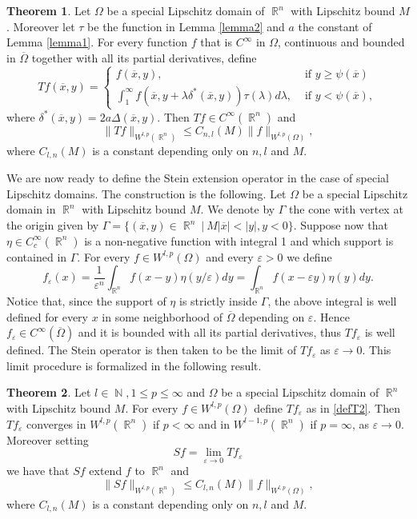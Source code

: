 \documentclass[12pt]{article}
\theoremstyle{definition}
\newtheorem{theorem}{Theorem}
\DeclareMathOperator\rr{\mathbb{R}}
\DeclareMathOperator\nn{\mathbb{N}}
\begin{document}
\begin{theorem}\label{defT}Let $\Omega$ be a special Lipschitz domain of $\rr^n$ with Lipschitz bound $M$. Moreover let $\tau$ be the function in Lemma \ref{lemma2} and $a$ the constant of Lemma \ref{lemma1}. For every function $f$ that is $C^\infty$ in $ \Omega$, continuous and bounded in $\overline \Omega$ together with all its partial derivatives, define
\begin{equation} Tf(\overline x, y)= \begin{cases}
						f(\overline x, y), & \text{ if } y\ge\psi(\overline x) \\
						\int_1^\infty f(\overline x, y+ \lambda \delta^*(\overline x,y))\tau(\lambda)d\lambda, & \text{ if } y<\psi(\overline x),		
\end{cases}
\label{defT2}\end{equation}
where $\delta^*(\overline x,y)=2a\Delta(\overline x, y).$ Then $Tf \in C^\infty(\rr^n)$ and 
\[\| Tf\|_{W^{l,p}(\rr^n)}\le C_{n,l}(M) \| f\|_{W^{l,p}(\Omega)} ,\]
where $C_{l,n}(M)$ is a constant depending only on $n,l$ and $M.$
\end{theorem}

We are now ready to define the Stein extension operator in the case of special Lipschitz domains. The construction is the following. Let $\Omega$ be a special Lipschitz domain in $\rr^n$ with Lipschitz bound $M$. We denote by $\Gamma$ the cone with vertex at the origin given by $\Gamma=\{(\overline x, y) \in \rr^n \ | \ M |\overline x|<|y|, y<0 \}$. Suppose now that $\eta \in C^\infty_c(\rr^n)$ is a non-negative function with integral 1 and which support is contained in $\Gamma.$ For every $f \in W^{l,p}(\Omega)$ and every $\varepsilon>0$ we define
\[f_\varepsilon(x)=\frac{1}{\varepsilon^n}\int_{\rr^n} f(x-y) \eta(y/\varepsilon)dy =\int_{\rr^n} f(x-\varepsilon y) \eta(y)dy.\]
Notice that, since the support of $\eta$ is strictly inside $\Gamma$, the above integral is well defined for every $x$ in some neighborhood of $\overline \Omega$ depending on $\varepsilon$. Hence $f_\varepsilon \in C^\infty(\overline\Omega)$ and it is bounded with all its partial derivatives, thus $Tf_\varepsilon$ is well defined. The Stein operator is then taken to be the limit of $Tf_\varepsilon$ as $\varepsilon \to 0.$ This limit procedure is formalized in the following result.

\begin{theorem}\label{Sdef}
Let $l \in \nn,1\le p \le \infty$ and $\Omega$ be a special Lipschitz domain of $\rr^n$ with Lipschitz bound $M$. For every $f \in W^{l,p}(\Omega)$ define $Tf_\varepsilon$ as in \eqref{defT2}. Then $Tf_\varepsilon $ converges in $W^{l,p}(\rr^n)$ if $p<\infty$ and in $W^{l-1,p}(\rr^n)$ if $p=\infty$, as $\varepsilon \to 0.$ Moreover setting
\[ Sf=\lim_{\varepsilon \to 0} Tf_\varepsilon\]
we have that $Sf$ extend $f$ to $\rr^n$ and 
\[ \| Sf\|_{W^{l,p}(\rr^n)} \le C_{l,n}(M) \| f\|_{W^{l,p}(\Omega) } ,\] 
where $C_{l,n}(M)$ is a constant depending only on $n,l$ and $M.$
\end{theorem}
\end{document}
